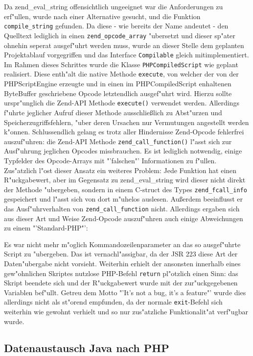 Da zend\_eval\_string offensichtlich ungeeignet war die Anforderungen zu erf"ullen, wurde nach einer Alternative gesucht, und
die Funktion \texttt{compile\_string} gefunden. Da diese - wie bereits der Name andeutet - den Quelltext lediglich in einen
\texttt{zend\_opcode\_array} "ubersetzt und dieser sp"ater ohnehin seperat ausgef"uhrt werden muss, wurde an dieser Stelle dem
geplanten Projektablauf vorgegriffen und das Interface \texttt{Compilable} gleich mitimplementiert. Im Rahmen dieses Schrittes
wurde die Klasse \texttt{PHPCompiledScript} wie geplant realisiert. Diese enth"alt die native Methode \texttt{execute}, von welcher
der von der PHPScriptEngine erzeugte und in einen im PHPCompiledScript enhaltenen ByteBuffer geschriebene Opcode letztendlich
ausgef"uhrt wird. Hierzu sollte urspr"unglich die Zend-API Methode \texttt{execute()} verwendet werden. Allerdings f"uhrte jeglicher
Aufruf dieser Methode ausschlie\ss lich zu Abst"urzen und Speicherzugriffsfehlern, "uber deren Ursachen nur Vermutungen angestellt
werden k"onnen. Schlussendlich gelang es trotz aller Hindernisse Zend-Opcode fehlerfrei auszuf"uhren: die Zend-API Methode
\texttt{zend\_call\_function()} l"asst sich zur Ausf"uhrung jeglichen Opcodes missbrauchen. Es ist lediglich notwendig, einige
Typfelder des Opcode-Arrays mit "'falschen"' Informationen zu f"ullen. Zus"atzlich l"ost dieser Ansatz ein weiteres Problem:
Jede Funktion hat einen R"uckgabewert, aber im Gegensatz zu zend\_eval\_string wird dieser nicht direkt der Methode "ubergeben,
sondern in einem C-struct des Types \texttt{zend\_fcall\_info} gespeichert und l"asst sich von dort m"uhelos auslesen.
Au\ss erdem beeinflusst er das Ausf"uhrverhalten von \texttt{zend\_call\_function} nicht. Allerdings ergaben sich aus dieser 
Art und Weise Zend-Opcode auszuf"uhren auch einige Abweichungen zu einem "'Standard-PHP"':

Es war nicht mehr m"oglich Kommandozeilenparameter an das so ausgef"uhrte Script zu "ubergeben. Das ist vernachl"assigbar, da
der JSR 223 diese Art der Daten"ubergabe nicht vorsieht. Weiterhin erhielt der ansonsten innerhalb eines gew"ohnlichen Skriptes nutzlose
PHP-Befehl \texttt{return} pl"otzlich einen Sinn: das Skript beendete sich und der R"uckgabewert wurde mit der zur"uckgegebenen
Variablen bef"ullt. Getreu dem Motto "'It's not a bug, it's a feature"' wurde dies allerdings nicht als st"orend empfunden, da
der normale \texttt{exit}-Befehl sich weiterhin wie gewohnt verhielt und so nur zus"atzliche Funktionalit"at verf"ugbar wurde.

\subsection{Datenaustausch Java nach PHP}
\label{sec:chap1:impl:3}

